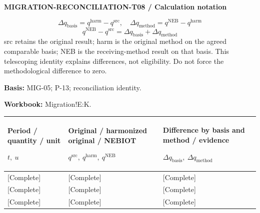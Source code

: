 \par\begingroup\sffamily\fontsize{8}{10}\selectfont\color{NEBGreen}\setlength{\parskip}{2pt}\setlength{\abovedisplayskip}{4pt}\setlength{\belowdisplayskip}{4pt}\setlength{\abovedisplayshortskip}{2pt}\setlength{\belowdisplayshortskip}{3pt}
\textbf{MIGRATION-RECONCILIATION-T08 / Calculation notation}\par
{\fontsize{9}{11}\selectfont\[ \Delta q_{\mathrm{basis}}=q^{\mathrm{harm}}-q^{\mathrm{src}},\quad \Delta q_{\mathrm{method}}=q^{\mathrm{NEB}}-q^{\mathrm{harm}} \]}
{\fontsize{9}{11}\selectfont\[ q^{\mathrm{NEB}}-q^{\mathrm{src}}=\Delta q_{\mathrm{basis}}+\Delta q_{\mathrm{method}} \]}
src retains the original result; harm is the original method on the agreed comparable basis; NEB is the receiving-method result on that basis. This telescoping identity explains differences, not eligibility. Do not force the methodological difference to zero.\par
\textbf{Basis:} MIG-05; P-13; reconciliation identity.\par
\textbf{Workbook:} Migration!E:K.\par\endgroup
{\sffamily\fontsize{8.3}{10.3}\selectfont\begin{longtable}{@{}P{54.83mm} P{54.83mm} P{54.83mm}@{}}
\toprule
\textbf{Period / quantity / unit}\par {\normalfont\fontsize{8.2}{10}\selectfont $t,\ u$} & \textbf{Original / harmonized original / NEBIOT}\par {\normalfont\fontsize{8.2}{10}\selectfont $q^{\mathrm{src}},\ q^{\mathrm{harm}},\ q^{\mathrm{NEB}}$} & \textbf{Difference by basis and method / evidence}\par {\normalfont\fontsize{8.2}{10}\selectfont $\Delta q_{\mathrm{basis}},\ \Delta q_{\mathrm{method}}$}\\\midrule\endhead
\rule{0pt}{8mm}[Complete] & [Complete] & [Complete]\\\hline
\rule{0pt}{8mm}[Complete] & [Complete] & [Complete]\\\hline
\rule{0pt}{8mm}[Complete] & [Complete] & [Complete]\\\hline
\end{longtable}}
